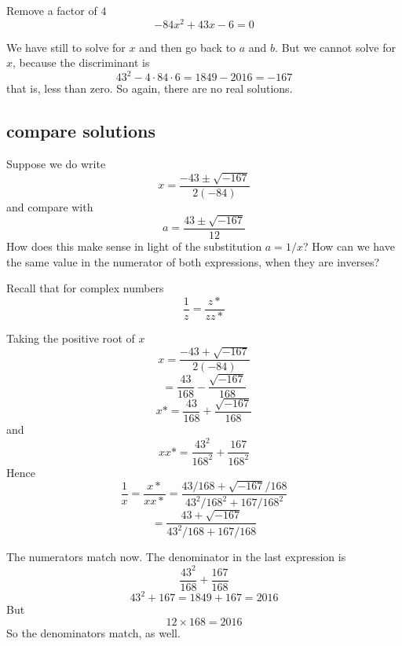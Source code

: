 \documentclass[11pt, oneside]{article}
\begin{document}
Remove a factor of $4$
\[ -84 x^2 + 43x - 6 = 0 \]

We have still to solve for $x$ and then go back to $a$ and $b$.  But we cannot solve for $x$, because the discriminant is
\[ 43^2 - 4 \cdot 84 \cdot 6 = 1849 - 2016 = - 167  \]
that is, less than zero.  So again, there are no real solutions.

\subsection*{compare solutions}

Suppose we do write
\[ x = \frac{-43 \pm \sqrt{-167}}{2 (-84)} \]
and compare with
\[ a =  \frac{43 \pm \sqrt{-167}}{12}  \]
How does this make sense in light of the substitution $a = 1/x$?  How can we have the same value in the numerator of both expressions, when they are inverses?

Recall that for complex numbers
\[ \frac{1}{z} = \frac{z*}{zz*} \]

Taking the positive root of $x$
\[ x =  \frac{-43 + \sqrt{-167}}{2 (-84)} \]
\[ = \frac{43}{168} - \frac{\sqrt{-167}}{168} \]
\[ x* =  \frac{43}{168} + \frac{\sqrt{-167}}{168} \]
and 
\[ xx* = \frac{43^2}{168^2} + \frac{167}{168^2} \]
Hence
\[ \frac{1}{x} = \frac{x*}{xx*} = \frac{43/168 + \sqrt{-167}/168}{43^2/168^2 + 167/168^2} \]
\[ = \frac{43 + \sqrt{-167}}{43^2/168 + 167/168} \]

The numerators match now.  The denominator in the last expression is
\[ \frac{43^2}{168} + \frac{167}{168} \]
\[ 43^2 + 167 = 1849 + 167 = 2016 \]
But
\[ 12 \times 168 = 2016 \]
So the denominators match, as well.
\end{document}

